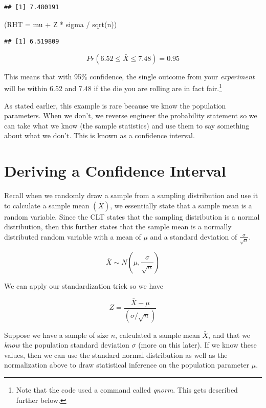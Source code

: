 \documentclass[
]{book}
\newenvironment{Shaded}{\begin{snugshade}}{\end{snugshade}}
\newcommand{\AttributeTok}[1]{\textcolor[rgb]{0.77,0.63,0.00}{#1}}
\newcommand{\FunctionTok}[1]{\textcolor[rgb]{0.00,0.00,0.00}{#1}}
\newcommand{\NormalTok}[1]{#1}
\newcommand{\SpecialCharTok}[1]{\textcolor[rgb]{0.00,0.00,0.00}{#1}}
\begin{document}
\begin{verbatim}
## [1] 7.480191
\end{verbatim}

\begin{Shaded}
\begin{Highlighting}[]
\NormalTok{(}\AttributeTok{RHT =}\NormalTok{ mu }\SpecialCharTok{+}\NormalTok{ Z }\SpecialCharTok{*}\NormalTok{ sigma }\SpecialCharTok{/} \FunctionTok{sqrt}\NormalTok{(n))}
\end{Highlighting}
\end{Shaded}

\begin{verbatim}
## [1] 6.519809
\end{verbatim}

\[Pr(6.52 \leq \bar{X} \leq 7.48) = 0.95\]

This means that with 95\% confidence, the single outcome from your \emph{experiment} will be within 6.52 and 7.48 if the die you are rolling are in fact fair.\footnote{Note that the code used a command called \emph{qnorm}. This gets described further below.}

As stated earlier, this example is rare because we know the population parameters. When we don't, we reverse engineer the probability statement so we can take what we know (the sample statistics) and use them to say something about what we don't. This is known as a confidence interval.

\hypertarget{deriving-a-confidence-interval}{%
\section{Deriving a Confidence Interval}\label{deriving-a-confidence-interval}}

Recall when we randomly draw a sample from a sampling distribution and use it to calculate a sample mean \((\bar{X})\), we essentially state that a sample mean is a random variable. Since the CLT states that the sampling distribution is a normal distribution, then this further states that the sample mean is a normally distributed random variable with a mean of \(\mu\) and a standard deviation of \(\frac{\sigma}{\sqrt{n}}\).

\[\bar{X} \sim N\left(\mu,\frac{\sigma}{\sqrt{n}}\right)\]

We can apply our standardization trick so we have

\[Z=\frac{\bar{X}-\mu}{(\sigma/\sqrt{n})}\]

Suppose we have a sample of size \(n\), calculated a sample mean \(\bar{X}\), and that we \emph{know} the population standard deviation \(\sigma\) (more on this later). If we know these values, then we can use the standard normal distribution as well as the normalization above to draw statistical inference on the population parameter \(\mu\).
\end{document}
